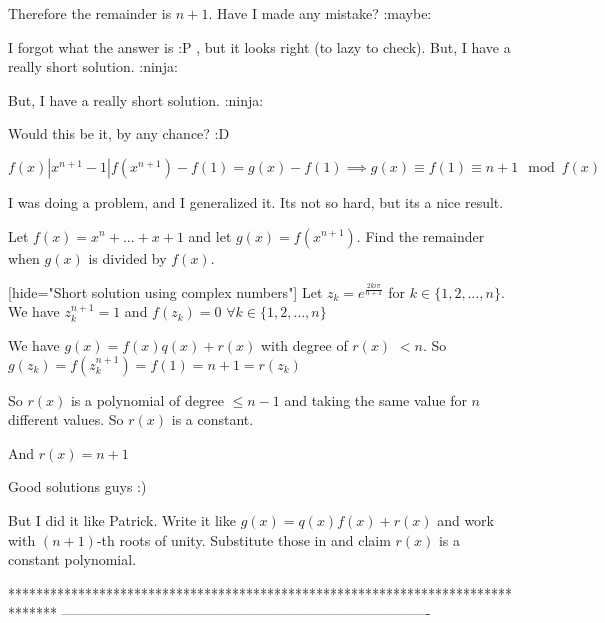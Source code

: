 \begin{mysolution}
	\begin{tcolorbox} Therefore the remainder is $ \boxed{n+1}$.
Have I made any mistake?  :maybe:\end{tcolorbox}
I forgot what the answer is  :P , but it looks right (to lazy to check).
But, I have a really short solution.  :ninja:
\end{mysolution}



\begin{mysolution}
	\begin{tcolorbox}
But, I have a really short solution.  :ninja:\end{tcolorbox}

Would this be it, by any chance?  :D 

$ f(x)|x^{n+1}-1|f(x^{n+1})-f(1) = g(x)-f(1)\implies g(x)\equiv f(1)\equiv n+1\mod{f(x)}$
\end{mysolution}



\begin{mysolution}
	\begin{tcolorbox}I was doing a problem, and I generalized it. Its not so hard, but its a nice result.

Let $ f(x) = x^{n}+...+x+1$ and let $ g(x) = f(x^{n+1})$. Find the remainder when $ g(x)$ is divided by $ f(x)$.\end{tcolorbox}

[hide="Short solution using complex numbers"]
Let $ z_{k}=e^{\frac{2ki\pi}{n+1}}$ for $ k\in\{1,2,\ldots,n\}$. We have $ z_{k}^{n+1}=1$ and $ f(z_{k})=0$ $ \forall k\in\{1,2,\ldots,n\}$

We have $ g(x)=f(x)q(x)+r(x)$ with degree of $ r(x)$ $ <n$. So $ g(z_{k})=f(z_{k}^{n+1})=f(1)=n+1=r(z_{k})$

So $ r(x)$ is a polynomial of degree $ \leq n-1$ and taking the same value for $ n$ different values. So $ r(x)$ is a constant.

And $ r(x)=n+1$
\end{mysolution}



\begin{mysolution}
	Good solutions guys :)

But I did it like Patrick. Write it like $ g(x)=q(x)f(x)+r(x)$ and work with $ (n+1)$-th roots of unity. Substitute those in and claim $ r(x)$ is a constant polynomial.
\end{mysolution}
*******************************************************************************
-------------------------------------------------------------------------------

